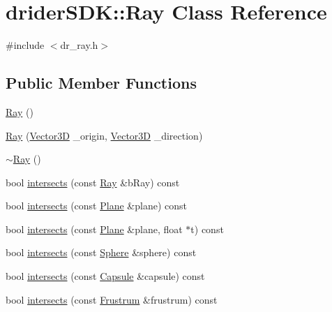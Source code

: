 \hypertarget{classdrider_s_d_k_1_1_ray}{}\section{drider\+S\+DK\+:\+:Ray Class Reference}
\label{classdrider_s_d_k_1_1_ray}


{\ttfamily \#include $<$dr\+\_\+ray.\+h$>$}

\subsection*{Public Member Functions}
\begin{DoxyCompactItemize}
\item 
\hyperlink{classdrider_s_d_k_1_1_ray_abff6862c02165733a7c6d68b669b795d}{Ray} ()
\item 
\hyperlink{classdrider_s_d_k_1_1_ray_aa34f727ec759f76cb389e8162b26cb23}{Ray} (\hyperlink{classdrider_s_d_k_1_1_vector3_d}{Vector3D} \+\_\+origin, \hyperlink{classdrider_s_d_k_1_1_vector3_d}{Vector3D} \+\_\+direction)
\item 
\hyperlink{classdrider_s_d_k_1_1_ray_ac2aa7e3196cacec5d6a8b739cef4405f}{$\sim$\+Ray} ()
\item 
bool \hyperlink{classdrider_s_d_k_1_1_ray_ae82712f2cf693847b3a5f7f15254ed16}{intersects} (const \hyperlink{classdrider_s_d_k_1_1_ray}{Ray} \&b\+Ray) const
\item 
bool \hyperlink{classdrider_s_d_k_1_1_ray_af5b4d7cdb8e422fd3808b85789122d4d}{intersects} (const \hyperlink{classdrider_s_d_k_1_1_plane}{Plane} \&plane) const
\item 
bool \hyperlink{classdrider_s_d_k_1_1_ray_a712c0636a31b4fe72f2b6cc14decf117}{intersects} (const \hyperlink{classdrider_s_d_k_1_1_plane}{Plane} \&plane, float $\ast$t) const
\item 
bool \hyperlink{classdrider_s_d_k_1_1_ray_a05055967612158c946b36e965b0d817a}{intersects} (const \hyperlink{classdrider_s_d_k_1_1_sphere}{Sphere} \&sphere) const
\item 
bool \hyperlink{classdrider_s_d_k_1_1_ray_a3575c298825f7130c067490f65bcd60e}{intersects} (const \hyperlink{classdrider_s_d_k_1_1_capsule}{Capsule} \&capsule) const
\item 
bool \hyperlink{classdrider_s_d_k_1_1_ray_a9c83c1a5befaa12d3f65fe0c7cc45a7b}{intersects} (const \hyperlink{classdrider_s_d_k_1_1_frustrum}{Frustrum} \&frustrum) const
\end{DoxyCompactItemize}
